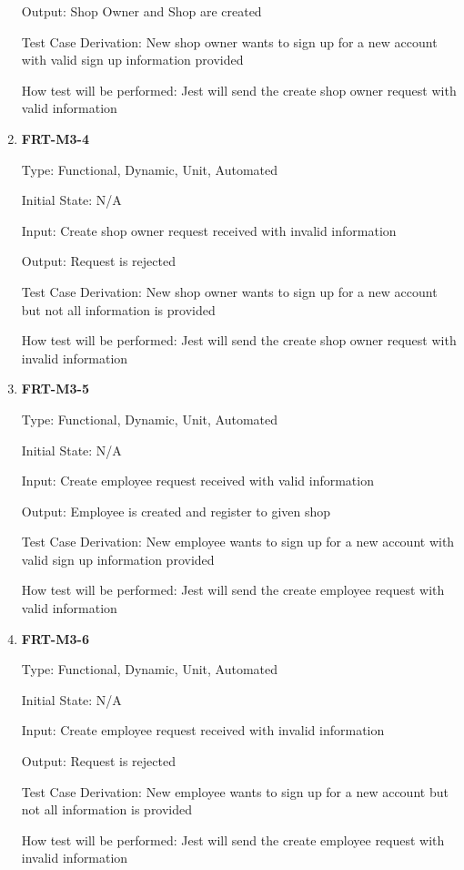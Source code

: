 \documentclass[12pt, titlepage]{article}
\begin{document}
\begin{enumerate}
	      Output: Shop Owner and Shop are created

	      Test Case Derivation: New shop owner wants to sign up for a new account with valid sign up
	      information provided

	      How test will be performed: Jest will send the create shop owner request with valid information

	\item \textbf{FRT-M3-4}

	      Type: Functional, Dynamic, Unit, Automated

	      Initial State: N/A

	      Input: Create shop owner request received with invalid information

	      Output: Request is rejected

	      Test Case Derivation: New shop owner wants to sign up for a new account but not all information is
	      provided

	      How test will be performed: Jest will send the create shop owner request with invalid information

	\item \textbf{FRT-M3-5}

	      Type: Functional, Dynamic, Unit, Automated

	      Initial State: N/A

	      Input: Create employee request received with valid information

	      Output: Employee is created and register to given shop

	      Test Case Derivation: New employee wants to sign up for a new account with valid sign up
	      information provided

	      How test will be performed: Jest will send the create employee request with valid information

	\item \textbf{FRT-M3-6}

	      Type: Functional, Dynamic, Unit, Automated

	      Initial State: N/A

	      Input: Create employee request received with invalid information

	      Output: Request is rejected

	      Test Case Derivation: New employee wants to sign up for a new account but not all information is
	      provided

	      How test will be performed: Jest will send the create employee request with invalid information


\end{enumerate}
\end{document}
